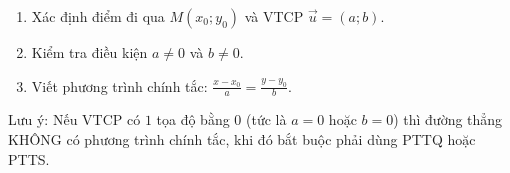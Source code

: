\begin{enumerate}
\item Xác định điểm đi qua $M(x_0; y_0)$ và VTCP $\overrightarrow{u}=(a; b)$.
\item Kiểm tra điều kiện $a \neq 0$ và $b \neq 0$.
\item Viết phương trình chính tắc: $\frac{x-x_0}{a} = \frac{y-y_0}{b}$.
\end{enumerate}
Lưu ý: Nếu VTCP có $1$ tọa độ bằng $0$ (tức là $a=0$ hoặc $b=0$) thì đường thẳng KHÔNG có phương trình chính tắc, khi đó bắt buộc phải dùng PTTQ hoặc PTTS.
